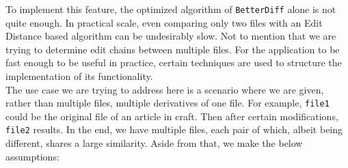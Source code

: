 \documentclass{article}
\begin{document}
To implement this feature, the optimized algorithm of \texttt{BetterDiff} alone is not quite enough. In practical scale, even comparing only two files with an Edit Distance based algorithm can be undesirably slow. Not to mention that we are trying to determine edit chains between multiple files. For the application to be fast enough to be useful in practice, certain techniques are used to structure the implementation of its functionality.\\

The use case we are trying to address here is a scenario where we are given, rather than multiple files, multiple derivatives of one file. For example, \texttt{file1} could be the original file of an article in craft. Then after certain modifications, \texttt{file2} results. In the end, we have multiple files, each pair of which, albeit being different, shares a large similarity. Aside from that, we make the below assumptions:
\end{document}
